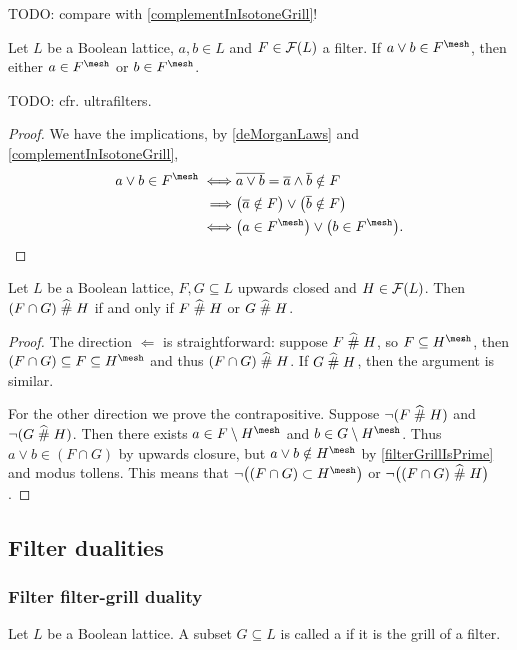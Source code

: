 TODO: compare with \ref{complementInIsotoneGrill}!


\begin{proposition}\label{filterGrillIsPrime}
Let $L$ be a Boolean lattice, $a,b\in L$ and $F \in \operatorname{\mathcal{F}}(L)$ a filter. If $a\vee b\in F^\mesh$, then either $a\in F^\mesh$ or $b\in F^\mesh$.
\end{proposition}
TODO: cfr. ultrafilters.
\begin{proof}
We have the implications, by \ref{deMorganLaws} and \ref{complementInIsotoneGrill},
\begin{align*}
a \vee b\in F^\mesh \iff& \overline{a\vee b} = \overline{a}\wedge\overline{b} \notin F \\
\implies& \big(\overline{a} \notin F\big)\lor \big(\overline{b} \notin F\big) \\
\iff& \big(a \in F^\mesh\big)\lor \big(b \in F^\mesh\big).
\end{align*}
\end{proof}

\begin{lemma} \label{subsetsFilterGrillIntersectionPrime}
Let $L$ be a Boolean lattice, $F,G\subseteq L$ upwards closed and $H\in \operatorname{\mathcal{F}}(L)$. Then $(F\cap G)\mathrel{\widehat{\#}} H$ \textup{if and only if} $F\mathrel{\widehat{\#}} H$ or $G \mathrel{\widehat{\#}} H$.
\end{lemma}
\begin{proof}
The direction $\Leftarrow$ is straightforward: suppose $F\mathrel{\widehat{\#}} H$, so $F\subseteq H^\mesh$, then $(F\cap G) \subseteq F \subseteq H^\mesh$ and thus $(F\cap G)\mathrel{\widehat{\#}} H$. If $G\mathrel{\widehat{\#}} H$, then the argument is similar.

For the other direction we prove the contrapositive. Suppose
$\neg(F\mathrel{\widehat{\#}} H)$ and $\neg(G \mathrel{\widehat{\#}} H)$. Then there exists $a\in F \setminus H^\mesh$ and $b\in G \setminus H^\mesh$. Thus $a\vee b\in (F\cap G)$ by upwards closure, but $a\vee b\notin H^\mesh$ by \ref{filterGrillIsPrime} and modus tollens. This means that $\neg\big((F\cap G)\subset H^\mesh\big)$ or $\neg\big((F\cap G)\mathrel{\widehat{\#}} H\big)$.
\end{proof}

\subsection{Filter dualities}
\subsubsection{Filter filter-grill duality}
\begin{definition}
Let $L$ be a Boolean lattice. A subset $G\subseteq L$ is called a  if it is the grill of a filter.
\end{definition}

